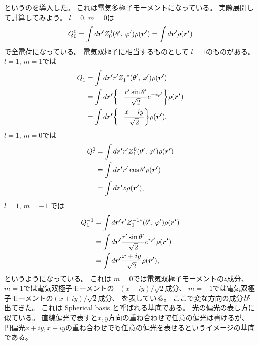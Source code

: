 \documentclass[../master.tex]{subfiles}
\begin{document}
というのを導入した。
これは電気多極子モーメントになっている。
実際展開して計算してみよう。
\(l=0,\,m=0\)は
\begin{align}
    Q_0^0
    = \int d\vb*{r'}  Z_0^0 (\theta',\,\varphi') \rho(\vb*{r'})
    = \int d\vb*{r'} \rho(\vb*{r'})
\end{align}
で全電荷になっている。
電気双極子に相当するものとして
\(l=1\)のものがある。
\(l=1,\,m = 1\)では
\begin{equation}\begin{aligned}[b]
     Q_1^{ 1}
    &= \int d\vb*{r'}  r' Z_1^{1*} (\theta',\,\varphi') \rho(\vb*{r'})\\
    &= \int d\vb*{r'} \qty{- \frac{r'\sin\theta'}{\sqrt{2}}e^{- i\varphi'}} \rho(\vb*{r'})\\
    &= \int d\vb*{r'} \qty{- \frac{x-iy}{\sqrt{2}}} \rho(\vb*{r'}),
\end{aligned}\end{equation}
\(l=1,\,m=0\)では
\begin{equation}\begin{aligned}[b]
    Q_1^0
    &= \int d\vb*{r'}  r' Z_1^0 (\theta',\,\varphi') \rho(\vb*{r'})\\
    &= \int d\vb*{r'}  r' \cos\theta' \rho(\vb*{r'})\\
    &= \int d\vb*{r'} z \rho(\vb*{r'}),
\end{aligned}\end{equation}
\(l=1,\,m=-1\) では
\begin{equation}\begin{aligned}[b]
    Q_1^{- 1}
    &= \int d\vb*{r'}  r' Z_1^{- 1*} (\theta',\,\varphi') \rho(\vb*{r'})\\
    &= \int d\vb*{r'} \frac{r'\sin\theta'}{\sqrt{2}}e^{ i\varphi'} \rho(\vb*{r'})\\
    &= \int d\vb*{r'} \frac{x+iy}{\sqrt{2}} \rho(\vb*{r'}),
\end{aligned}\end{equation}
というようになっている。
これは
\(m=0\)では電気双極子モーメントの\(z\)成分、
\(m=1\)では電気双極子モーメントの\(-(x-iy)/\sqrt{2}\)成分、
\(m=-1\)では電気双極子モーメントの\((x+iy)/\sqrt{2}\)成分、
を表している。
ここで変な方向の成分が出てきた。
これは Spherical basis と呼ばれる基底である。
光の偏光の表し方に似ている。
直線偏光で表すと\(x,y\)方向の重ね合わせで任意の偏光は書けるが、
円偏光\(x+iy,x-iy\)の重ね合わせでも任意の偏光を表せるというイメージの基底である。
\end{document}
